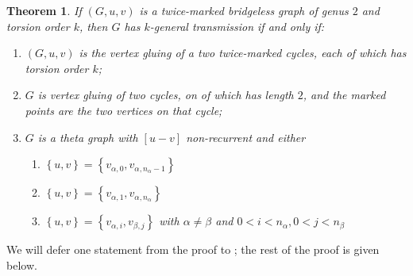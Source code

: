 \documentclass[11pt]{article}
\newtheorem{theorem}[theo]{Theorem}
\theoremstyle{definition}
\numberwithin{equation}{section}
\newcommand{\set}[1]{\left\{{#1}\right\}}
\begin{document}
\begin{theorem}\label{thm:g2general}
    If $(G,u,v)$ is a twice-marked bridgeless graph of genus $2$ and torsion order $k$, then $G$ has $k$-general transmission if and only if:
    \begin{enumerate}[label = \arabic*)]
        \item $(G,u,v)$ is the vertex gluing of a two twice-marked cycles, each of which has torsion order $k$;
       \item $G$ is vertex gluing of two cycles, on of which has length $2$, and the marked points are the two vertices on that cycle;
       \item $G$ is a theta graph with $[u-v]$ non-recurrent and either
       \begin{enumerate}[label = \alph*)]
           \item $\set{u,v} = \set{v_{\alpha,0}, v_{\alpha,n_\alpha-1}}$
           \item $\set{u,v} = \set{v_{\alpha,1}, v_{\alpha,n_\alpha}}$
           \item $\set{u,v} = \set{v_{\alpha,i}, v_{\beta,j}}$ with $\alpha \neq \beta$ and $0<i<n_\alpha,0<j<n_\beta$
       \end{enumerate}
    \end{enumerate}
\end{theorem}

We will defer one statement from the proof to ; the rest of the proof is given below.
\end{document}
